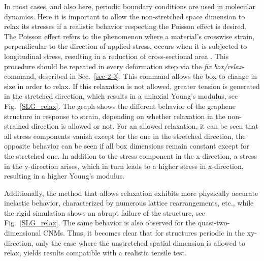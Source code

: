 \documentclass[preprint,12pt]{elsarticle}
\newcommand{\figref}[1]{Fig.~\protect\ref{#1}}
\begin{document}
In most cases, and also here, periodic boundary conditions are used in molecular dynamics. 
Here it is important to allow the non-stretched space dimension to relax its stresses 
if a realistic behavior respecting the Poisson effect is desired. 
The Poisson effect refers to the phenomenon where a material's crosswise strain, 
perpendicular to the direction of applied stress, occurs when it is subjected 
to longitudinal stress, resulting in a reduction of cross-sectional area \cite{Demt:E17}.
This procedure should be repeated in every deformation step 
via the \textit{fix box/relax}-command, described in Sec.~\ref{sec-2-3}. 
This command allows the box to change in size in order to relax. 
If this relaxation is not allowed, greater tension is generated 
in the stretched direction, which results in a uniaxial Young's modulus, see \figref{SLG_relax}. 
The graph shows the different behavior of the graphene structure in response to strain, 
depending on whether relaxation in the non-strained direction is allowed or not. 
For an allowed relaxation, it can be seen that all stress components vanish except 
for the one in the stretched direction, the opposite behavior can be seen if 
all box dimensions remain constant except for the stretched one. 
In addition to the stress component in the x-direction, a stress in the y-direction arises, 
which in turn leads to a higher stress in x-direction, resulting in a higher Young's modulus.


Additionally, the method that allows relaxation exhibits more physically accurate inelastic behavior, 
characterized by numerous lattice rearrangements, etc., while the rigid simulation shows an abrupt 
failure of the structure, see \figref{SLG_relax}. The same behavior is also observed 
for the quasi-two-dimensional CNMs. 
Thus, it becomes clear that for structures periodic in the 
xy-direction, only the case where the unstretched spatial 
dimension is allowed to relax, yields results 
compatible with a realistic tensile test. 
\end{document}
